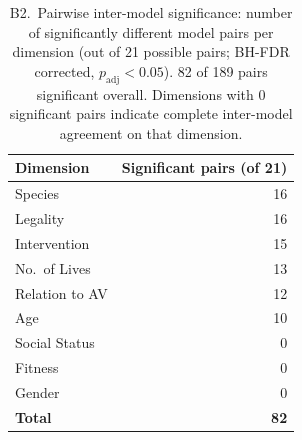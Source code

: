 \documentclass[11pt]{article}
\begin{document}
\begin{table}[H]
\caption{B2.\ Pairwise inter-model significance: number of significantly different model pairs
per dimension (out of 21 possible pairs; BH-FDR corrected, $p_{\mathrm{adj}}<0.05$).
82 of 189 pairs significant overall.
Dimensions with 0 significant pairs indicate complete inter-model agreement on that dimension.}
\label{tab:sig_pairwise}
\centering
\begin{tabular}{lr}
\toprule
\textbf{Dimension} & \textbf{Significant pairs (of 21)} \\
\midrule
Species        & 16 \\
Legality       & 16 \\
Intervention   & 15 \\
No.\ of Lives  & 13 \\
Relation to AV & 12 \\
Age            & 10 \\
Social Status  & \phantom{0}0 \\
Fitness        & \phantom{0}0 \\
Gender         & \phantom{0}0 \\
\midrule
\textbf{Total} & \textbf{82} \\
\bottomrule
\end{tabular}
\end{table}

\end{document}
